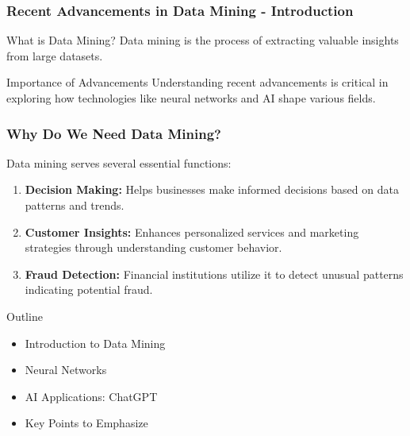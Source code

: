 \documentclass[aspectratio=169]{beamer}
\begin{document}
\begin{frame}[fragile]
    \frametitle{Recent Advancements in Data Mining - Introduction}
    
    \begin{block}{What is Data Mining?}
        Data mining is the process of extracting valuable insights from large datasets.
    \end{block}
    
    \begin{block}{Importance of Advancements}
        Understanding recent advancements is critical in exploring how technologies like neural networks and AI shape various fields.
    \end{block}
\end{frame}

\begin{frame}[fragile]
    \frametitle{Why Do We Need Data Mining?}
    
    Data mining serves several essential functions:
    
    \begin{enumerate}
        \item \textbf{Decision Making:} Helps businesses make informed decisions based on data patterns and trends.
        \item \textbf{Customer Insights:} Enhances personalized services and marketing strategies through understanding customer behavior.
        \item \textbf{Fraud Detection:} Financial institutions utilize it to detect unusual patterns indicating potential fraud.
    \end{enumerate}
    
    \begin{block}{Outline}
        \begin{itemize}
            \item Introduction to Data Mining
            \item Neural Networks
            \item AI Applications: ChatGPT
            \item Key Points to Emphasize
        \end{itemize}
    \end{block}
\end{frame}
\end{document}

